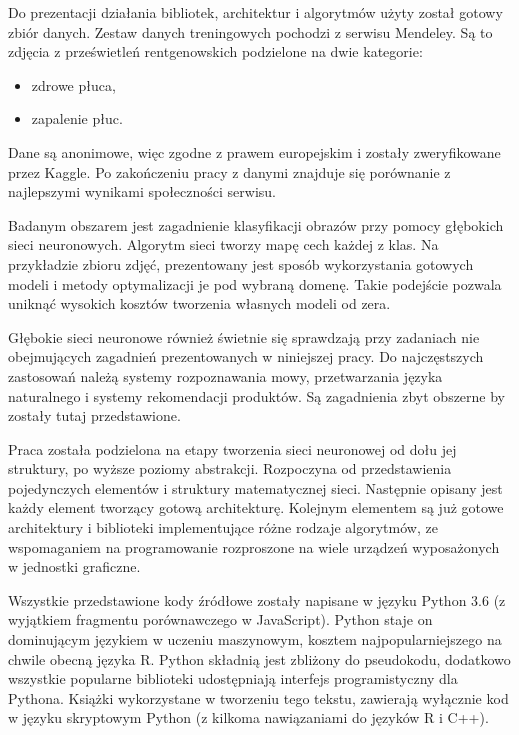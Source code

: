 \documentclass[12pt,a4paper,twoside,titlepage,openright]{book}
\begin{document}
Do prezentacji działania bibliotek, architektur i algorytmów użyty został gotowy zbiór danych. Zestaw danych treningowych pochodzi z serwisu Mendeley. Są to zdjęcia z prześwietleń rentgenowskich podzielone na dwie kategorie:
\begin{itemize}
\item zdrowe płuca,
\item zapalenie płuc.
\end{itemize} 
Dane są anonimowe, więc zgodne z prawem europejskim i zostały zweryfikowane przez Kaggle. Po zakończeniu pracy z danymi znajduje się porównanie z najlepszymi wynikami społeczności serwisu. \cite{siteMendeley}

Badanym obszarem jest zagadnienie klasyfikacji obrazów przy pomocy głębokich sieci neuronowych. Algorytm sieci tworzy mapę cech każdej z klas. Na przykładzie zbioru zdjęć, prezentowany jest sposób wykorzystania gotowych modeli i metody optymalizacji je pod wybraną domenę. Takie podejście pozwala uniknąć wysokich kosztów tworzenia własnych modeli od zera.

Głębokie sieci neuronowe również świetnie się sprawdzają przy zadaniach nie obejmujących zagadnień prezentowanych w niniejszej pracy. Do najczęstszych zastosowań należą systemy rozpoznawania mowy, przetwarzania języka naturalnego i systemy rekomendacji produktów. Są zagadnienia zbyt obszerne by zostały tutaj przedstawione.

Praca została podzielona na etapy tworzenia sieci neuronowej od dołu jej struktury, po wyższe poziomy abstrakcji. Rozpoczyna od przedstawienia pojedynczych elementów i struktury matematycznej sieci. Następnie opisany jest każdy element tworzący gotową architekturę. Kolejnym elementem są już gotowe architektury i biblioteki implementujące różne rodzaje algorytmów, ze wspomaganiem na programowanie rozproszone na wiele urządzeń wyposażonych w jednostki graficzne.

Wszystkie przedstawione kody źródłowe zostały napisane w języku Python 3.6 (z wyjątkiem fragmentu porównawczego w JavaScript). Python staje on dominującym językiem w uczeniu maszynowym, kosztem najpopularniejszego na chwile obecną języka R. \cite{sitePythonvR} Python składnią jest zbliżony do pseudokodu, dodatkowo wszystkie popularne biblioteki udostępniają interfejs programistyczny dla Pythona. Książki wykorzystane w tworzeniu tego tekstu, zawierają wyłącznie kod w języku skryptowym Python (z kilkoma nawiązaniami do języków R i C++).

\end{document}
